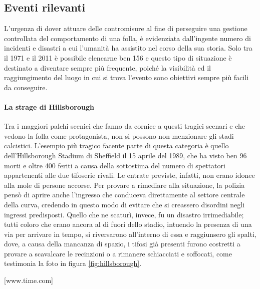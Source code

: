 \subsection{Eventi rilevanti}
L'urgenza di dover attuare delle contromisure al fine di perseguire una gestione controllata del comportamento di una folla, è evidenziata dall'ingente numero di incidenti e disastri a cui l'umanità ha assistito nel corso della sua storia. Solo tra il 1971 e il 2011 è possibile elencarne ben 156 \cite{Soomaroo2012} e questo tipo di situazione è destinato a diventare sempre più frequente, poiché la visibilità ed il raggiungimento del luogo in cui si trova l'evento sono obiettivi sempre più facili da conseguire.

\paragraph{La strage di Hillsborough}
Tra i maggiori palchi scenici che fanno da cornice a questi tragici scenari e che vedono la folla come protagonista, non si possono non menzionare gli stadi calcistici. \newline 
L'esempio più tragico facente parte di questa categoria è quello dell'Hillsborough Stadium di Sheffield il 15 aprile del 1989, che ha visto ben 96 morti e oltre 400 feriti a causa della sottostima del numero di spettatori appartenenti alle due tifoserie rivali. \newline 
Le entrate previste, infatti, non erano idonee alla mole di persone accorse. Per provare a rimediare alla situazione, la polizia pensò di aprire anche l'ingresso che conduceva direttamente al settore centrale della curva, credendo in questo modo di evitare che si creassero disordini negli ingressi predisposti. Quello che ne scaturì, invece, fu un disastro irrimediabile; tutti coloro che erano ancora al di fuori dello stadio, intuendo la presenza di una via per arrivare in tempo, si riversarono all'interno di essa e raggiunsero gli spalti, dove, a causa della mancanza di spazio, i tifosi già presenti furono costretti a provare a scavalcare le recinzioni o a rimanere schiacciati e soffocati, come testimonia la foto in figura \ref{fig:hillsborough}.

[www.time.com]

